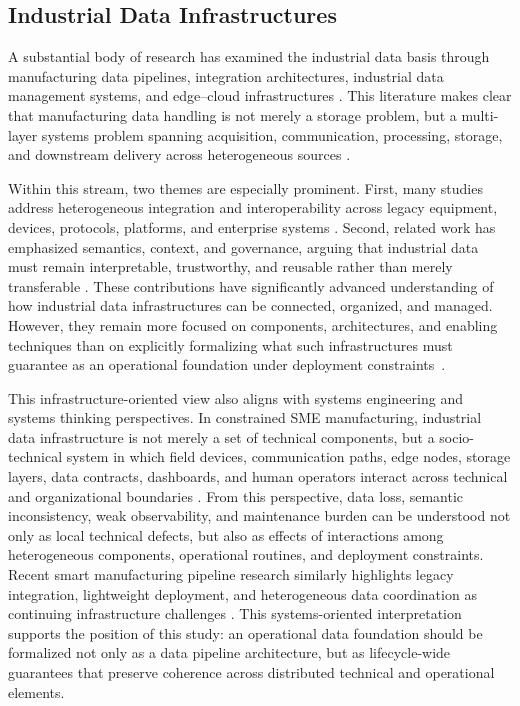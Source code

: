 \documentclass[systems,article,accept,pdftex,moreauthors]{Definitions/mdpi}
\begin{document}
\subsection{Industrial Data Infrastructures}
\label{sec:industrial_data_infrastructures}

A substantial body of research has examined the industrial data basis through manufacturing data pipelines, integration architectures, industrial data management systems, and edge--cloud infrastructures \cite{ismail2019manufacturing, raptis2019data, saqlain2019framework}. This literature makes clear that manufacturing data handling is not merely a storage problem, but a multi-layer systems problem spanning acquisition, communication, processing, storage, and downstream delivery across heterogeneous sources \cite{ismail2019manufacturing, odonovan2015industrial}.

Within this stream, two themes are especially prominent. First, many studies address heterogeneous integration and interoperability across legacy equipment, devices, protocols, platforms, and enterprise systems \cite{zeid2019interoperability, pereira2021towards, modoni2017enhancing}. Second, related work has emphasized semantics, context, and governance, arguing that industrial data must remain interpretable, trustworthy, and reusable rather than merely transferable \cite{hildebrandt2020ontology, morris2020foundations, westermann2022accessing}. These contributions have significantly advanced understanding of how industrial data infrastructures can be connected, organized, and managed. However, they remain more focused on components, architectures, and enabling techniques than on explicitly formalizing what such infrastructures must guarantee as an operational foundation under deployment \mbox{constraints \cite{ismail2019manufacturing, raptis2019data, morris2020foundations}}.

This infrastructure-oriented view also aligns with systems engineering and systems thinking perspectives. In constrained SME manufacturing, industrial data infrastructure is not merely a set of technical components, but a socio-technical system in which field devices, communication paths, edge nodes, storage layers, data contracts, dashboards, and human operators interact across technical and organizational boundaries \cite{Panchal2024,Rebentisch2022}. From this perspective, data loss, semantic inconsistency, weak observability, and maintenance burden can be understood not only as local technical defects, but also as effects of interactions among heterogeneous components, operational routines, and deployment constraints. Recent smart manufacturing pipeline research similarly highlights legacy integration, lightweight deployment, and heterogeneous data coordination as continuing infrastructure challenges \cite{Ceselli2025}. This systems-oriented interpretation supports the position of this study: an operational data foundation should be formalized not only as a data pipeline architecture, but as lifecycle-wide guarantees that preserve coherence across distributed technical and operational elements.
\end{document}
